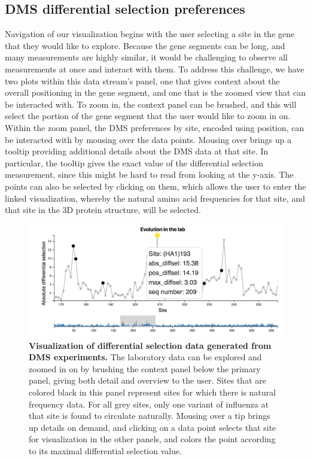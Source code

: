 \documentclass[sigchi, nonacm]{acmart}
\begin{document}
\subsection{DMS differential selection preferences}
Navigation of our visualization begins with the user selecting a site in the gene that they would like to explore.
Because the gene segments can be long, and many measurements are highly similar, it would be challenging to observe all measurements at once and interact with them.
To address this challenge, we have two plots within this data stream's panel, one that gives context about the overall positioning in the gene segment, and one that is the zoomed view that can be interacted with.
 To zoom in, the context panel can be brushed, and this will select the portion of the gene segment that the user would like to zoom in on.
Within the zoom panel, the DMS preferences by site, encoded using position, can be interacted with by mousing over the data points.
Mousing over brings up a tooltip providing additional details about the DMS data at that site.
In particular, the tooltip gives the exact value of the differential selection measurement, since this might be hard to read from looking at the y-axis.
The points can also be selected by clicking on them, which allows the user to enter the linked visualization, whereby the natural amino acid frequencies for that site, and that site in the 3D protein structure, will be selected.

\begin{figure}[H]
	\includegraphics[width=1.0\textwidth]{dms-brushed-tooltip.png}
	\caption{\textbf{Visualization of differential selection data generated from DMS experiments.}
  The laboratory data can be explored and zoomed in on by brushing the context panel below the primary panel, giving both detail and overview to the user.
Sites that are colored black in this panel represent sites for which there is natural frequency data.
For all grey sites, only one variant of influenza at that site is found to circulate naturally.
Mousing over a tip brings up details on demand, and clicking on a data point selects that site for visualization in the other panels, and colors the point according to its maximal differential selection value.
	}
	\label{dms-data}
\end{figure}
\end{document}
